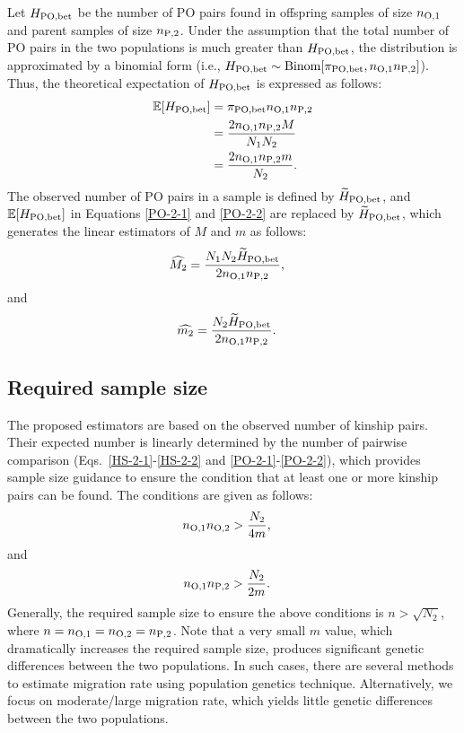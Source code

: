 \documentclass[12pt, English]{article}
\begin{document}
\begin{spacing}{1.9}
Let $H_{\rm PO,bet}$ be the number of PO pairs found in offspring samples of size $n_{\rm O, 1}$ and parent samples of size $n_{\rm P, 2}$. Under the assumption that the total number of PO pairs in the two populations is much greater than $H_{\rm PO,bet}$, the distribution is approximated by a binomial form (i.e., $H_{\rm PO,bet} \sim {\rm Binom}[\pi_{\rm PO,bet}, n_{\rm O, 1} n_{\rm P, 2}]$). Thus, the theoretical expectation of $H_{\rm PO,bet}$ is expressed as follows: 
\begin{align}
\mathbb{E}[H_{\rm PO, bet}] &= \pi_{\rm PO,bet} n_{\rm O, 1} n_{\rm P, 2} \nonumber\\
&= \frac{ 2 n_{\rm O, 1} n_{\rm P, 2} M } { N_{1} N_{2} } \label{PO-2-1} \\
&= \frac{ 2 n_{\rm O, 1} n_{\rm P, 2} m } { N_{2} }.
\label{PO-2-2}
\end{align}
The observed number of PO pairs in a sample is defined by $\widetilde{H}_{\rm PO, bet}$, and $\mathbb{E}[H_{\rm PO, bet}]$ in Equations \ref{PO-2-1} and \ref{PO-2-2} are replaced by $\widetilde{H}_{\rm PO, bet}$, which generates the linear estimators of $M$ and $m$ as follows:
\begin{align}
\widehat{M_2} &= \frac{N_{1} N_{2} \widetilde{H}_{\rm PO,bet} } {2 n_{\rm O, 1} n_{\rm P, 2} },
\label{PO-3}
\end{align}
and
\begin{align}
\widehat{m_2} &= \frac{N_{2} \widetilde{H}_{\rm PO,bet} } {2 n_{\rm O, 1} n_{\rm P, 2} }.
\label{PO-4}
\end{align}

\subsection{Required sample size}

The proposed estimators are based on the observed number of kinship pairs. Their expected number is linearly determined by the number of pairwise comparison (Eqs.~\ref{HS-2-1}-\ref{HS-2-2} and \ref{PO-2-1}-\ref{PO-2-2}), which provides sample size guidance to ensure the condition that at least one or more kinship pairs can be found. The conditions are given as follows: 
\begin{align}
n_{\rm O, 1} n_{\rm O, 2} &> \frac{ N_{2} } { 4m },
\label{RS-1}
\end{align}
and
\begin{align}
n_{\rm O, 1} n_{\rm P, 2} &> \frac{ N_{2} } { 2m }.
\label{RS-2}
\end{align}
Generally, the required sample size to ensure the above conditions is $n>\sqrt{N_2}$, where $n = n_{\rm O, 1}=n_{\rm O, 2}=n_{\rm P, 2}$. Note that a very small $m$ value, which dramatically increases the required sample size, produces significant genetic differences between the two populations. In such cases, there are several methods to estimate migration rate using population genetics technique. Alternatively, we focus on moderate/large migration rate, which yields little genetic differences between the two populations. 


\end{spacing}
\end{document}
